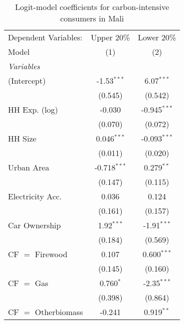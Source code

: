 
\begin{table}[htbp!]
   \centering
   \small
   \begin{adjustbox}{width = 1\textwidth, max height = 0.95\textheight, center}
      \begin{threeparttable}[b]
         \caption{\label{tab:Logit_1_MLI} Logit-model coefficients for carbon-intensive consumers in Mali}
         \begin{tabular}{lcc}
            \tabularnewline \midrule \midrule
            Dependent Variables: & Upper 20\%     & Lower 20\%\\   
            Model                & (1)            & (2)\\  
            \midrule
            \emph{Variables}\\
            (Intercept)          & -1.53$^{***}$  & 6.07$^{***}$\\   
                                 & (0.545)        & (0.542)\\   
            HH Exp. (log)        & -0.030         & -0.945$^{***}$\\   
                                 & (0.070)        & (0.072)\\   
            HH Size              & 0.046$^{***}$  & -0.093$^{***}$\\   
                                 & (0.011)        & (0.020)\\   
            Urban Area           & -0.718$^{***}$ & 0.279$^{**}$\\   
                                 & (0.147)        & (0.115)\\   
            Electricity Acc.     & 0.036          & 0.124\\   
                                 & (0.161)        & (0.157)\\   
            Car Ownership        & 1.92$^{***}$   & -1.91$^{***}$\\   
                                 & (0.184)        & (0.569)\\   
            CF $=$ Firewood      & 0.107          & 0.600$^{***}$\\   
                                 & (0.145)        & (0.160)\\   
            CF $=$ Gas           & 0.760$^{*}$    & -2.35$^{***}$\\   
                                 & (0.398)        & (0.864)\\   
            CF $=$ Otherbiomass  & -0.241         & 0.919$^{**}$\\   

\end{tabular}
\end{threeparttable}
\end{adjustbox}
\end{table}
